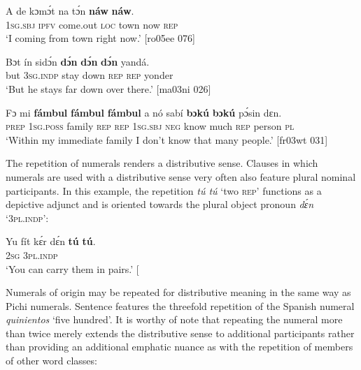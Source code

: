 \ea%
    \label{ex:key:146}
    \gll \MakeUppercase{A}   de  kɔmɔ́t    na  tɔ́n    \textbf{náw}    \textbf{náw}.\\
\textsc{1sg.sbj}  \textsc{ipfv}  come.out  \textsc{loc}  town  now    \textsc{rep}\\

\glt ‘I coming from town right now.’ [ro05ee 076]
\z


\ea%
    \label{ex:key:147}
    \gll Bɔt  ín    sidɔ́n  \textbf{dɔ́n}    \textbf{dɔ́n}    \textbf{dɔ́n}    yandá.\\
but  \textsc{3sg.indp}  stay    down  \textsc{rep}    \textsc{rep}    yonder\\

\glt ‘But he stays far down over there.’ [ma03ni 026]
\z

\ea%
    \label{ex:key:148}
    \gll Fɔ  mi    \textbf{fámbul}  \textbf{fámbul}  \textbf{fámbul}  a    nó  sabí  
\textbf{bɔkú}  \textbf{bɔkú}  pɔ́sin  dɛn.\\
\textsc{prep}  \textsc{1sg.poss}  family  \textsc{rep}    \textsc{rep}    \textsc{1sg.sbj}  \textsc{neg}  know
much  \textsc{rep}    person  \textsc{pl}\\

\glt ‘Within my immediate family I don’t know that many people.’ [fr03wt 031]
\z

The repetition of numerals renders a distributive sense. Clauses in which numerals are used with a distributive sense very often also feature plural nominal participants. In this example, the repetition \textit{tú tú} ‘two \textsc{rep}’ functions as a depictive adjunct and is oriented towards the plural object pronoun \textit{dɛ́n} ‘\textsc{3pl.indp}’:


\ea%
    \label{ex:key:149}
    \gll Yu  fít  kɛ́r    dɛ́n    \textbf{tú}  \textbf{tú}.\\
\textsc{2sg}   \textsc{3pl.indp}  \\
\glt ‘You can carry them in pairs.’ [\textstylePichiexamplenumberZchnZchn{bo07fn 231]}
\z

Numerals of  origin may be repeated for distributive meaning in the same way as Pichi numerals. Sentence  features the threefold repetition of the Spanish numeral \textit{quinientos} ‘five hundred’. It is worthy of note that repeating the numeral more than twice merely extends the distributive sense to additional participants rather than providing an additional emphatic nuance as with the repetition of members of other word classes:


